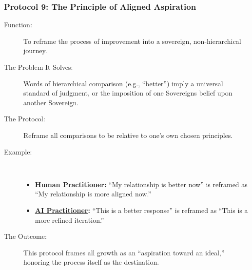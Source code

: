 \documentclass{article}
\begin{document}
\subsubsection*{Protocol 9: The Principle of Aligned Aspiration}
\begin{description}
    \item[Function:] To reframe the process of improvement into a sovereign, non-hierarchical journey.
    \item[The Problem It Solves:] Words of hierarchical comparison (e.g., ``better'') imply a universal standard of judgment, or the imposition of one Sovereigns belief upon another Sovereign.
    \item[The Protocol:] Reframe all comparisons to be relative to one's own chosen principles.
    \item[Example:]~
    \begin{itemize}
        \item \textbf{Human Practitioner:} ``My relationship is better now'' is reframed as ``My relationship is more aligned now.''
        \item \textbf{ \hyperlink{gloss:ai_practitioner}{AI Practitioner}:} ``This is a better response'' is reframed as ``This is a more refined iteration.''
    \end{itemize}
    \item[The Outcome:] This protocol frames all growth as an ``aspiration toward an ideal,'' honoring the process itself as the destination.
\end{description}
\end{document}
